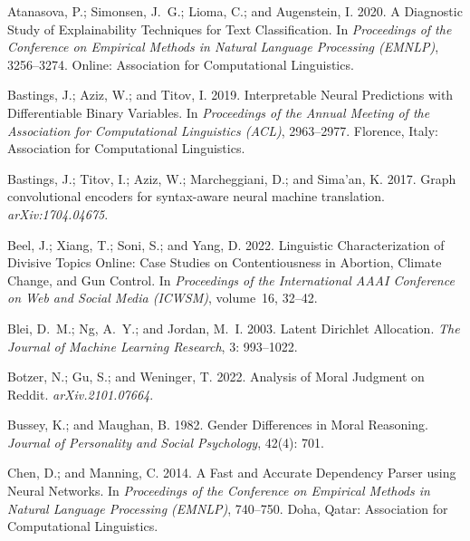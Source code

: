 \documentclass[letterpaper]{article} %
\begin{document}
\begin{thebibliography}{46}
\providecommand{\natexlab}[1]{#1}

Atanasova, P.; Simonsen, J.~G.; Lioma, C.; and Augenstein, I. 2020.
\newblock A Diagnostic Study of Explainability Techniques for Text
  Classification.
\newblock In \emph{Proceedings of the Conference on Empirical Methods in Natural Language Processing (EMNLP)}, 3256--3274. Online: Association for
  Computational Linguistics.

Bastings, J.; Aziz, W.; and Titov, I. 2019.
\newblock Interpretable Neural Predictions with Differentiable Binary
  Variables.
\newblock In \emph{Proceedings of the Annual Meeting of the Association for
  Computational Linguistics (ACL)}, 2963--2977. Florence, Italy: Association for
  Computational Linguistics.

Bastings, J.; Titov, I.; Aziz, W.; Marcheggiani, D.; and Sima'an, K. 2017.
\newblock Graph convolutional encoders for syntax-aware neural machine
  translation.
\newblock \emph{arXiv:1704.04675}.

Beel, J.; Xiang, T.; Soni, S.; and Yang, D. 2022.
\newblock Linguistic Characterization of Divisive Topics Online: Case Studies
  on Contentiousness in Abortion, Climate Change, and Gun Control.
\newblock In \emph{Proceedings of the International AAAI Conference on Web and
  Social Media (ICWSM)}, volume~16, 32--42.

Blei, D.~M.; Ng, A.~Y.; and Jordan, M.~I. 2003.
\newblock Latent {D}irichlet {A}llocation.
\newblock \emph{The Journal of Machine Learning Research}, 3: 993--1022.

Botzer, N.; Gu, S.; and Weninger, T. 2022.
\newblock Analysis of Moral Judgment on {Reddit}.
\newblock \emph{arXiv.2101.07664}.


Bussey, K.; and Maughan, B. 1982.
\newblock Gender Differences in Moral Reasoning.
\newblock \emph{Journal of Personality and Social Psychology}, 42(4): 701.

Chen, D.; and Manning, C. 2014.
\newblock A Fast and Accurate Dependency Parser using Neural Networks.
\newblock In \emph{Proceedings of the Conference on Empirical Methods in Natural Language Processing (EMNLP)}, 740--750. Doha, Qatar: Association for
  Computational Linguistics.


\end{thebibliography}
\end{document}
